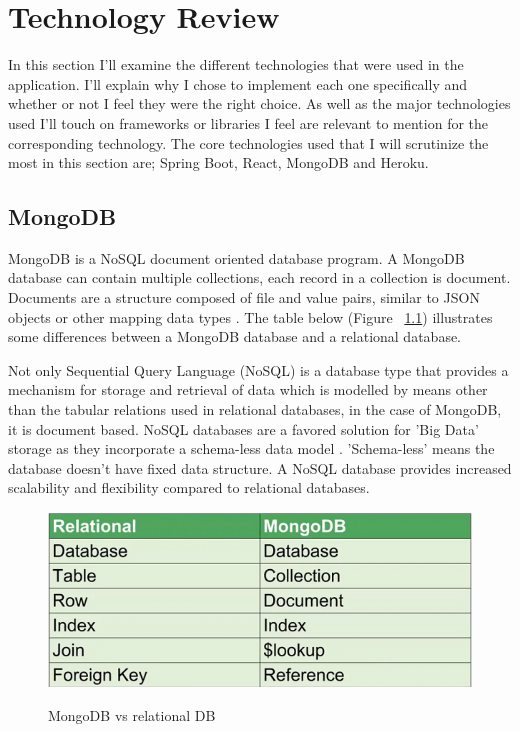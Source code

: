 \chapter{Technology Review}
In this section I'll examine the different technologies that were used in the application. I'll explain why I chose to implement each one specifically and whether or not I feel they were the right choice. As well as the major technologies used I'll touch on frameworks or libraries I feel are relevant to mention for the corresponding technology. The core technologies used that I will scrutinize the most in this section are; Spring Boot, React, MongoDB and Heroku.

\section{MongoDB}
MongoDB is a NoSQL document oriented database program. A MongoDB database can contain multiple collections, each record in a collection is document. Documents are a structure composed of file and value pairs, similar to JSON objects or other mapping data types \cite{Mongo:doc}. The table below (Figure ~\ref{mongo2_label}) illustrates some differences between a MongoDB database and a relational database.

Not only Sequential Query Language (NoSQL) is a database type that provides a mechanism for storage and retrieval of data which is modelled by means other than the tabular relations used in relational databases, in the case of MongoDB, it is document based. NoSQL databases are a favored solution for 'Big Data' storage as they incorporate a schema-less data model \cite{wiki:nosql}. 'Schema-less' means the database doesn't have fixed data structure. A NoSQL database provides increased scalability and ﬂexibility compared to relational databases.

\begin{figure}[h]
    \centering
    \includegraphics[scale=0.4]{Images/mongo2.png} 
    \label{mongo2_label}
    \caption{MongoDB vs relational DB}
\end{figure}

